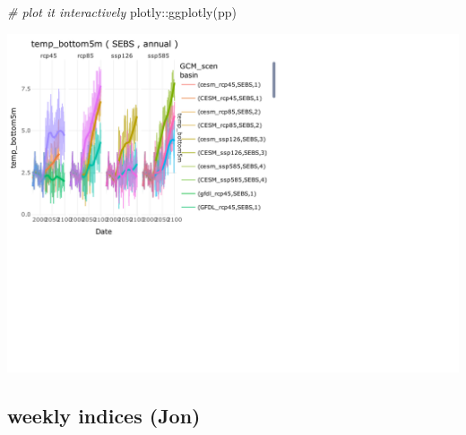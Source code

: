 \documentclass[
]{article}
\newenvironment{Shaded}{\begin{snugshade}}{\end{snugshade}}
\newcommand{\CommentTok}[1]{\textcolor[rgb]{0.56,0.35,0.01}{\textit{#1}}}
\newcommand{\FunctionTok}[1]{\textcolor[rgb]{0.00,0.00,0.00}{#1}}
\newcommand{\NormalTok}[1]{#1}
\newcommand{\SpecialCharTok}[1]{\textcolor[rgb]{0.00,0.00,0.00}{#1}}
\begin{document}
\begin{Shaded}
\begin{Highlighting}[]
  \CommentTok{\# plot it interactively}
\NormalTok{  plotly}\SpecialCharTok{::}\FunctionTok{ggplotly}\NormalTok{(pp)}
\end{Highlighting}
\end{Shaded}

\begin{center}\includegraphics{ACLIM2_quickStart_files/figure-latex/unnamed-chunk-6-1} \end{center}

\hypertarget{weekly-indices-jon}{%
\subsection{weekly indices (Jon)}\label{weekly-indices-jon}}
\end{document}
